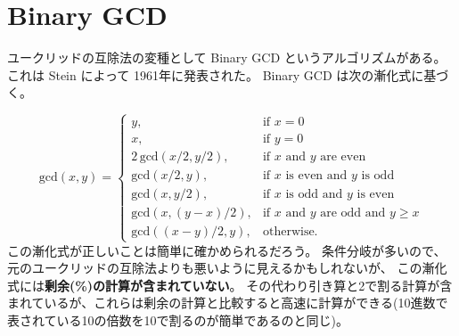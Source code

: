 \documentclass[a4paper,twoside,onecolumn,openany,article,10pt]{memoir}
\theoremstyle{remark}
\begin{document}
\section{Binary GCD}
ユークリッドの互除法の変種として Binary GCD というアルゴリズムがある。
これは Stein によって 1961年に発表された。
Binary GCD は次の漸化式に基づく。

\begin{equation}
\mathrm{gcd}(x, y) =
\begin{cases}
y,& \text{if } x = 0\\
x,& \text{if } y = 0\\
2\,\mathrm{gcd}(x/2, y/2),& \text{if $x$ and $y$ are even}\\
\mathrm{gcd}(x/2, y),& \text{if $x$ is even and $y$ is odd}\\
\mathrm{gcd}(x, y/2),& \text{if $x$ is odd and $y$ is even}\\
\mathrm{gcd}(x, (y-x)/2),& \text{if $x$ and $y$ are odd and $y \ge x$}\\
\mathrm{gcd}((x-y)/2, y),& \text{otherwise.}
\end{cases}
\label{eq:bgcd}
\end{equation}
この漸化式が正しいことは簡単に確かめられるだろう。
条件分岐が多いので、元のユークリッドの互除法よりも悪いように見えるかもしれないが、
この漸化式には\textbf{剰余(\%)の計算が含まれていない}。
その代わり引き算と2で割る計算が含まれているが、これらは剰余の計算と比較すると高速に計算ができる(10進数で表されている10の倍数を10で割るのが簡単であるのと同じ)。
\end{document}
